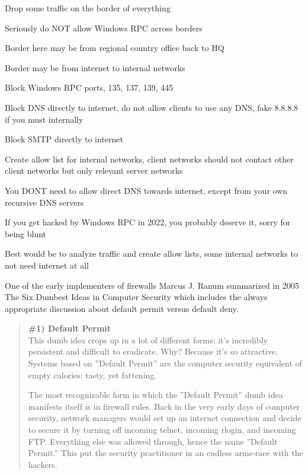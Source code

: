 \documentclass[Screen16to9,17pt]{foils}
\begin{document}
\begin{list2}
\item Drop some traffic on the border of everything
\item Seriously do NOT allow Windows RPC across borders
\item Border here may be from regional country office back to HQ
\item Border may be from internet to internal networks
\item Block Windows RPC ports, 135, 137, 139, 445
\item Block DNS directly to internet, do not allow clients to use any DNS, fake 8.8.8.8 if you must internally
\item Block SMTP directly to internet
\item Create allow list for internal networks, client networks should not contact other client networks but only relevant server networks
\end{list2}

You DONT need to allow direct DNS towards internet, except from your own recursive DNS servers

If you get hacked by Windows RPC in 2022, you probably deserve it, sorry for being blunt

Best would be to analyze traffic and create allow lists, some internal networks to not need internet at all




One of the early implementers of firewalls Marcus J. Ranum summarized in 2005 The Six Dumbest Ideas in Computer Security  which includes the always appropriate discussion about default permit versus default deny.

\begin{quote}\small {\bf
\#1) Default Permit}\\
This dumb idea crops up in a lot of different forms; it’s incredibly persistent and difficult to eradicate. Why? Because it’s so attractive. Systems based on ”Default Permit” are the computer security equivalent of empty calories: tasty, yet fattening.

The most recognizable form in which the ”Default Permit” dumb idea manifests itself is in firewall rules. Back in the very early days of computer security, network managers would set up an internet connection and decide to secure it by turning off incoming telnet, incoming rlogin, and incoming FTP. Everything else was allowed through, hence the name ”Default Permit.” This put the security practitioner in an endless arms-race with the hackers.
\end{quote}
\end{document}

